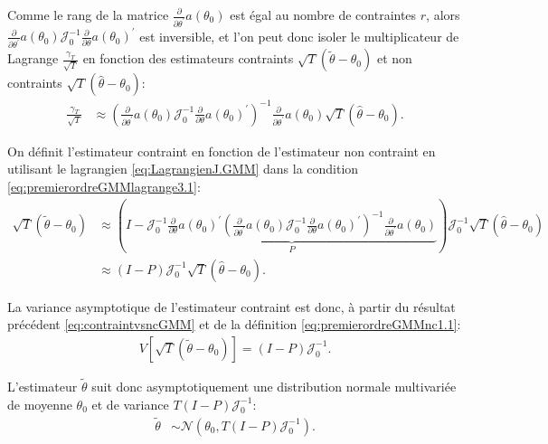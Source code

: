 Comme le rang de la matrice $\frac{\partial}{\partial\theta^{\prime}}
a(\theta_0)$ est égal au nombre de contraintes $r$, alors
$\frac{\partial}{\partial\theta^{\prime}} a(\theta_0)
\mathcal{J}_0^{-1}
\frac{\partial}{\partial\theta}a(\theta_0)^{\prime}$ est inversible,
et l'on peut donc isoler le multiplicateur de Lagrange
$\frac{\gamma_{\scriptscriptstyle T}}{\sqrt{T}}$ en fonction des
estimateurs contraints $\sqrt{T} (\tilde\theta - \theta_0)$ et non
contraints $\sqrt{T} (\hat\theta - \theta_0)$:
\begin{align}
  \label{eq:LagrangienJ.GMM}
  \frac{\gamma_{\scriptscriptstyle T}}{\sqrt{T}} & \approx
  \left(\frac{\partial}{\partial\theta^{\prime}} a(\theta_0)
    \mathcal{J}_0^{-1}
    \frac{\partial}{\partial\theta}a(\theta_0)^{\prime} \right)^{-1}
  \frac{\partial}{\partial\theta^{\prime}} a(\theta_0) \sqrt{T}
  (\hat\theta - \theta_0).
\end{align}

On définit l'estimateur contraint en fonction de l'estimateur non
contraint en utilisant le lagrangien \eqref{eq:LagrangienJ.GMM} dans
la condition \eqref{eq:premierordreGMMlagrange3.1}:
\begin{align}
  \label{eq:contraintvsncGMM}
  \sqrt{T} (\tilde\theta - \theta_0) &\approx
  \left(I-\underbrace{\mathcal{J}_0^{-1}\frac{\partial}{\partial\theta}a(\theta_0)^{\prime}\left(\frac{\partial}{\partial\theta^{\prime}}
        a(\theta_0) \mathcal{J}_0^{-1}
        \frac{\partial}{\partial\theta}a(\theta_0)^{\prime}
      \right)^{-1}\frac{\partial}{\partial\theta^{\prime}} a(\theta_0)
    }_{P}\right)\mathcal{J}_0^{-1}\sqrt{T} (\hat\theta - \theta_0) \\
  & \approx \left(I-P\right)\mathcal{J}_0^{-1}\sqrt{T} (\hat\theta -
  \theta_0). \nonumber
\end{align}

La variance asymptotique de l'estimateur contraint est donc, à partir
du résultat précédent \eqref{eq:contraintvsncGMM} et de la définition
\eqref{eq:premierordreGMMnc1.1}:
\begin{align}
  \label{eq:VcontraintGMM}
  V\left[\sqrt{T} (\tilde\theta - \theta_0) \right] =
  \left(I-P\right)\mathcal{J}_0^{-1}.
\end{align}

L'estimateur $\tilde\theta$ suit donc asymptotiquement une
distribution normale multivariée de moyenne $\theta_0$ et de variance
$T\left(I-P\right)\mathcal{J}_0^{-1}$:
\begin{align}
  \label{eq:distcontraintGMM}
  \tilde\theta &\sim
  \mathcal{N}\left(\theta_0,T\left(I-P\right)\mathcal{J}_0^{-1}\right).
\end{align}

